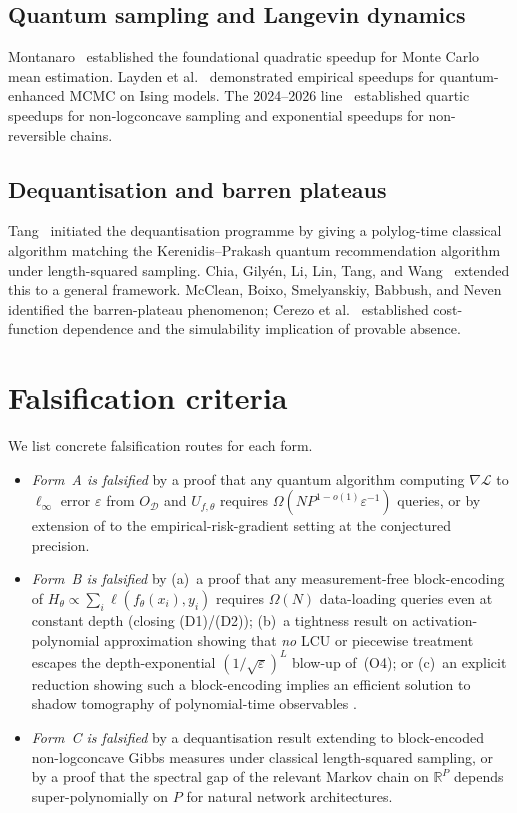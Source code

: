 \documentclass[11pt,a4paper]{article}
\theoremstyle{definition}
\newcommand{\R}{\mathbb{R}}
\newcommand{\veps}{\varepsilon}
\newcommand{\loss}{\mathcal{L}}
\newcommand{\Dset}{\mathcal{D}}
\begin{document}
\subsection{Quantum sampling and Langevin dynamics}

Montanaro~\cite{Montanaro2015} established the foundational quadratic speedup for Monte Carlo mean estimation. Layden et al.~\cite{LaydenEtAl2023} demonstrated empirical speedups for quantum-enhanced MCMC on Ising models. The 2024--2026 line~\cite{QuantumNonLogconcave2025,QuantumMCMCOpt2025} established quartic speedups for non-logconcave sampling and exponential speedups for non-reversible chains.

\subsection{Dequantisation and barren plateaus}

Tang~\cite{Tang2019} initiated the dequantisation programme by giving a polylog-time classical algorithm matching the Kerenidis--Prakash quantum recommendation algorithm under length-squared sampling. Chia, Gily\'{e}n, Li, Lin, Tang, and Wang~\cite{ChiaEtAl2020} extended this to a general framework. McClean, Boixo, Smelyanskiy, Babbush, and Neven~\cite{McCleanEtAl2018} identified the barren-plateau phenomenon; Cerezo et al.~\cite{CerezoEtAl2021,CerezoEtAl2025} established cost-function dependence and the simulability implication of provable absence.

\section{Falsification criteria}\label{sec:falsification}

We list concrete falsification routes for each form.

\begin{itemize}[itemsep=2pt]
\item \emph{Form~A is falsified} by a proof that any quantum algorithm computing $\nabla\loss$ to $\ell_\infty$ error $\veps$ from $O_\Dset$ and $U_{f,\theta}$ requires $\Omega(NP^{1-o(1)}\veps^{-1})$ queries, or by extension of \cite{ZhangLengLi2023} to the empirical-risk-gradient setting at the conjectured precision.
\item \emph{Form~B is falsified} by (a)~a proof that any measurement-free block-encoding of $H_\theta \propto \sum_i \ell(f_\theta(x_i), y_i)$ requires $\Omega(N)$ data-loading queries even at constant depth (closing (D1)/(D2)); (b)~a tightness result on activation-polynomial approximation showing that \emph{no} LCU or piecewise treatment escapes the depth-exponential $(1/\sqrt{\veps})^L$ blow-up of~(O4); or (c)~an explicit reduction showing such a block-encoding implies an efficient solution to shadow tomography of polynomial-time observables \cite{AbbasEtAl2023}.
\item \emph{Form~C is falsified} by a dequantisation result extending \cite{ChiaEtAl2020} to block-encoded non-logconcave Gibbs measures under classical length-squared sampling, or by a proof that the spectral gap of the relevant Markov chain on $\R^P$ depends super-polynomially on $P$ for natural network architectures.
\end{itemize}
\end{document}
